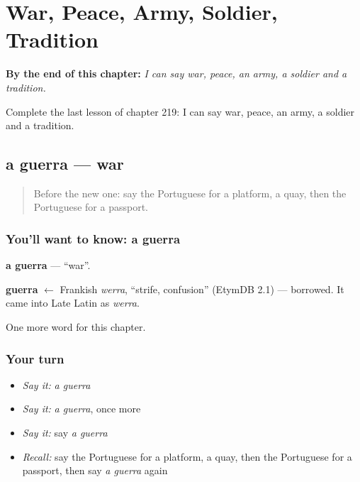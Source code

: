 
\chapter{War, Peace, Army, Soldier, Tradition}
\label{ch:pt-war-peace-army-soldier-tradition}

\begin{chapteropening}
\textbf{By the end of this chapter:} \emph{I can say war, peace, an army, a soldier and a tradition.}

Complete the last lesson of chapter 219: I can say war, peace, an army, a soldier and a tradition.
\end{chapteropening}

\section[a guerra]{a guerra — war}

\label{lesson:PT-C219-guerra}



\begin{quote}
Before the new one: say the Portuguese for a platform, a quay, then the Portuguese for a passport.
\end{quote}

\subsection*{You'll want to know: a guerra}
\textbf{a guerra} — \textquotedblleft{}war\textquotedblright{}.

\begin{cousinweb}
\textbf{guerra} $\leftarrow$ Frankish \emph{werra}, \textquotedblleft{}strife, confusion\textquotedblright{} (EtymDB 2.1) — borrowed. It came into Late Latin as \emph{werra}.
\end{cousinweb}

\begin{grammarlens}[title={What you've built}]
One more word for this chapter.
\end{grammarlens}

\subsection*{Your turn}
\begin{itemize}
\raggedright
  \item \emph{Say it:} \emph{a guerra}
  \item \emph{Say it:} \emph{a guerra}, once more
  \item \emph{Say it:} say \emph{a guerra}
  \item \emph{Recall:} say the Portuguese for a platform, a quay, then the Portuguese for a passport, then say \emph{a guerra} again
\end{itemize}

